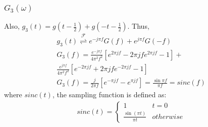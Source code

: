 \documentclass{beamer}
\providecommand{\sbrak}[1]{\ensuremath{{}\left[#1\right]}}
\providecommand{\brak}[1]{\ensuremath{\left(#1\right)}}
\providecommand{\fourier}{\overset{\mathcal{F}}{ \rightleftharpoons}}
\begin{document}
\begin{frame}
    \frametitle{$G_3(\omega)$}
    \begin{flushleft}
Also, $g_3(t) = g\brak{t - \frac{1}{2}} + g\brak{-t - \frac{1}{2}}$. Thus, 
\begin{align}
    g_3(t) \fourier e^{-j\pi f}G(f) + e^{j\pi f}G(-f)\\
    G_3(f)= \frac{e^{-j\pi f}}{4\pi^2f^2}\sbrak{e^{2\pi jf} - 2\pi jfe^{2\pi jf} - 1} + \\
    \frac{e^{j\pi f}}{4\pi^2f^2}\sbrak{ e^{-2\pi jf} + 2\pi jfe^{-2\pi jf} -1}\\
        G_3(f) = \frac{j}{2\pi f}\sbrak{e^{-\pi jf} - e^{\pi jf}}=\frac{\sin{\pi f}}{\pi f} = sinc(f)
    \end{align}
    where $sinc(t)$, the sampling function is defined as:
\begin{align}
    sinc(t) = 
    \begin{cases}
    1 & t = 0\\
    \frac{\sin(\pi t)}{\pi t} & otherwise
    \end{cases}
\end{align}
    \end{flushleft}
\end{frame}
\end{document}
